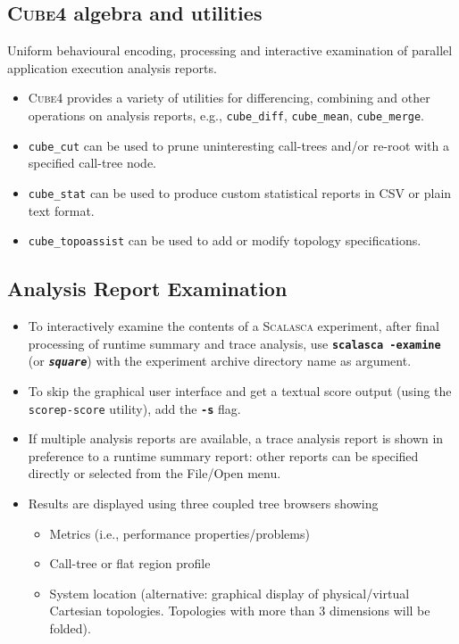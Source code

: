 \documentclass[a4paper]{article}
\newcommand{\Scalasca}{\textsc{Scalasca}\xspace}
\newcommand{\Cube}{\textsc{Cube}\xspace}
\begin{document}
\subsection*{\Cube{4} algebra and utilities}

Uniform behavioural encoding, processing and interactive examination of
parallel application execution analysis reports.

\begin{itemize}
  \item \Cube{4} provides a variety of utilities 
  for differencing, combining and other operations on analysis reports, e.g.,
  \texttt{cube\_diff}, \texttt{cube\_mean}, \texttt{cube\_merge}.
  \item \texttt{cube\_cut} can be used to prune uninteresting
call-trees and/or re-root with a specified call-tree node.
  \item \texttt{cube\_stat} can be used to produce custom statistical reports in CSV or plain text format.
  \item \texttt{cube\_topoassist} can be used to add or modify topology specifications.
\end{itemize}

\clearpage


\subsection*{Analysis Report Examination}
\begin{itemize}
  \item To interactively examine the contents of a \Scalasca experiment,
        after final processing of runtime summary and trace analysis,
        use \textbf{\texttt{scalasca -examine}} (or \textbf{\texttt{\em square}}) with the
        experiment archive directory name as argument.
  \item To skip the graphical user interface and get a textual score output (using the 
        \texttt{scorep-score} utility), add the \textbf{\texttt{-s}} flag.
  \item If multiple analysis reports are available, 
        a trace analysis report is shown in preference to a runtime
        summary report: other reports can be specified directly or selected
        from the File/Open menu.
  \item Results are displayed using three coupled tree browsers showing
    \begin{itemize}
      \setlength{\itemsep}{0cm}
      \item Metrics (i.e., performance properties/problems)
      \item Call-tree or flat region profile
      \item System location (alternative: graphical display of physical/virtual
            Cartesian topologies. Topologies with more than 3 dimensions will be folded).
    \end{itemize}
\end{itemize}
\end{document}
